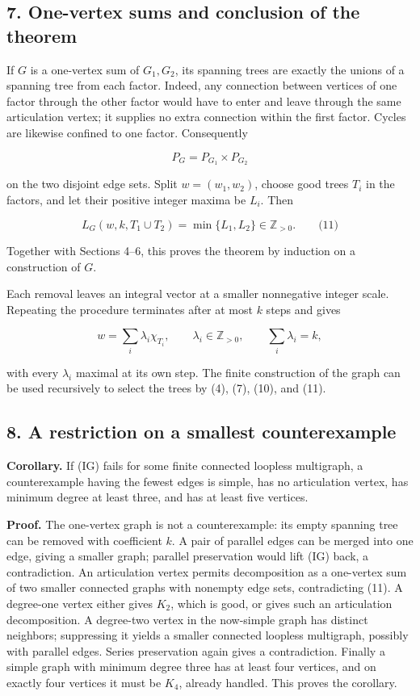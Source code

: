 \documentclass{article}
\begin{document}
\subsection{7. One-vertex sums and conclusion of the theorem}

If \(G\) is a one-vertex sum of \(G_1,G_2\), its spanning trees are exactly the unions of a spanning tree from each factor. Indeed, any connection between vertices of one factor through the other factor would have to enter and leave through the same articulation vertex; it supplies no extra connection within the first factor. Cycles are likewise confined to one factor. Consequently

\[
P_G=P_{G_1}\times P_{G_2}
\]

on the two disjoint edge sets. Split \(w=(w_1,w_2)\), choose good trees \(T_i\) in the factors, and let their positive integer maxima be \(L_i\). Then

\[
L_G(w,k,T_1\cup T_2)=\min\{L_1,L_2\}\in\mathbb Z_{\gt 0}.\qquad\text{(11)}
\]

Together with Sections 4--6, this proves the theorem by induction on a construction of \(G\).

Each removal leaves an integral vector at a smaller nonnegative integer scale. Repeating the procedure terminates after at most \(k\) steps and gives

\[
w=\sum_i\lambda_i\chi_{T_i},\qquad
\lambda_i\in\mathbb Z_{\gt 0},\qquad \sum_i\lambda_i=k,
\]

with every \(\lambda_i\) maximal at its own step. The finite construction of the graph can be used recursively to select the trees by (4), (7), (10), and (11).

\subsection{8. A restriction on a smallest counterexample}

\textbf{Corollary.} If (IG) fails for some finite connected loopless multigraph, a counterexample having the fewest edges is simple, has no articulation vertex, has minimum degree at least three, and has at least five vertices.

\textbf{Proof.} The one-vertex graph is not a counterexample: its empty spanning tree can be removed with coefficient \(k\). A pair of parallel edges can be merged into one edge, giving a smaller graph; parallel preservation would lift (IG) back, a contradiction. An articulation vertex permits decomposition as a one-vertex sum of two smaller connected graphs with nonempty edge sets, contradicting (11). A degree-one vertex either gives \(K_2\), which is good, or gives such an articulation decomposition. A degree-two vertex in the now-simple graph has distinct neighbors; suppressing it yields a smaller connected loopless multigraph, possibly with parallel edges. Series preservation again gives a contradiction. Finally a simple graph with minimum degree three has at least four vertices, and on exactly four vertices it must be \(K_4\), already handled. This proves the corollary.
\end{document}
